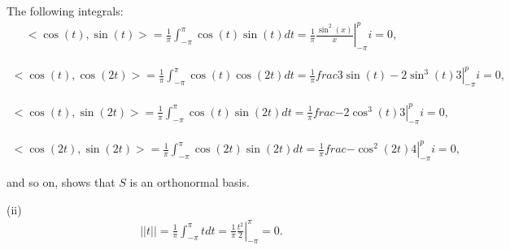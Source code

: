 \documentclass[11.5pt, letterpaper, bibtotoc,
    tablecaptionabove, figurecaptionabove]{article}
\begin{document}
The following integrals:
\begin{align*}
    <\cos(t),\sin(t)> = \frac{1}{\pi}\int_{-\pi}^\pi\cos(t)\sin(t)dt=
    \frac{1}{\pi}\left.\frac{\sin^2(x)}{x}\right\lvert_{-\pi}^pi=0,
\end{align*}

\begin{align*}
    <\cos(t),\cos(2t)> = \frac{1}{\pi}\int_{-\pi}^\pi\cos(t)\cos(2t)dt=
    \frac{1}{\pi}\left.frac{3\sin(t)-2\sin^3(t)}{3}\right\lvert_{-\pi}^pi=0,
\end{align*}

\begin{align*}
    <\cos(t),\sin(2t)> = \frac{1}{\pi}\int_{-\pi}^\pi\cos(t)\sin(2t)dt=
    \frac{1}{\pi}\left.frac{-2\cos^3(t)}{3}\right\lvert_{-\pi}^pi=0,
\end{align*}

\begin{align*}
    <\cos(2t),\sin(2t)> = \frac{1}{\pi}\int_{-\pi}^\pi\cos(2t)\sin(2t)dt=
    \frac{1}{\pi}\left.frac{-\cos^2(2t)}{4}\right\lvert_{-\pi}^pi=0,
\end{align*}

and so on, shows that $S$ is an orthonormal basis.

(ii)
\begin{align*}
    ||t|| = \frac{1}{\pi}\int_{-\pi}^\pi tdt=
    \frac{1}{\pi}\left.\frac{t^2}{2}\right\lvert_{-\pi}^\pi=0.
\end{align*}
\end{document}
